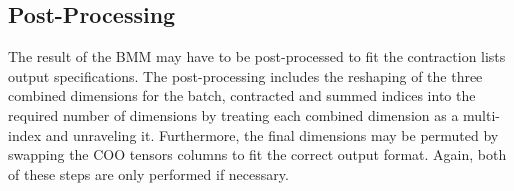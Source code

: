\subsection{Post-Processing}
The result of the BMM may have to be post-processed to fit the contraction lists output
specifications. The post-processing includes the reshaping of the three combined dimensions for
the batch, contracted and summed indices into the required number of dimensions by treating 
each combined dimension as a multi-index and unraveling it. Furthermore, the final dimensions 
may be permuted by swapping the COO tensors columns to fit the correct output format. Again, 
both of these steps are only performed if necessary.